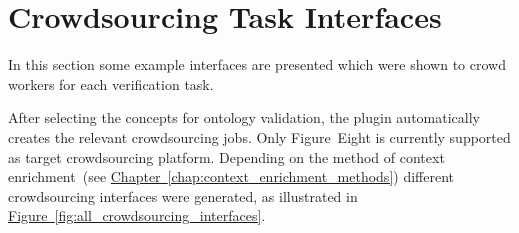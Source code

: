 \section{Crowdsourcing Task Interfaces}\label{sec:crowdsourcing_task_interfaces}
In this section some example interfaces are presented which were shown to crowd workers for each verification task. 

After selecting the concepts for ontology validation, the plugin automatically creates the relevant crowdsourcing jobs. Only Figure~Eight is currently supported as target crowdsourcing platform. Depending on the method of context enrichment~(see \hyperref[chap:context_enrichment_methods]{Chapter~\ref*{chap:context_enrichment_methods}}) different crowdsourcing interfaces were generated, as illustrated in \hyperref[fig:all_crowdsourcing_interfaces]{Figure~\ref*{fig:all_crowdsourcing_interfaces}}. 

